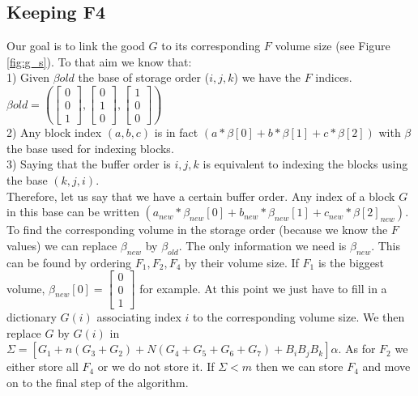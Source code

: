 \documentclass[conference]{IEEEtran}
\begin{document}
  \subsection{Keeping F4}
  Our goal is to link the good $G$ to its corresponding $F$ volume size (see Figure \ref{fig:g_s}).
  To that aim we know that: \\
  1) Given $\beta{old}$ the base of storage order ($i,j,k$) we have the $F$ indices.
    $\beta{old} = (
    \begin{bmatrix} 0 \\ 0 \\ 1 \end{bmatrix},
    \begin{bmatrix} 0 \\ 1 \\ 0 \end{bmatrix},
    \begin{bmatrix} 1 \\ 0 \\ 0 \end{bmatrix})$ \\
  2) Any block index $(a,b,c)$ is in fact $(a*\beta[0] + b*\beta[1] + c*\beta[2])$ with $\beta$ the base used for indexing blocks. \\
  3) Saying that the buffer order is $i, j, k$ is equivalent to indexing the blocks using the base $(k,j,i)$. \\

  Therefore, let us say that we have a certain buffer order.
  Any index of a block $G$ in this base can be written $(a_{new}*\beta_{new}[0] + b_{new}*\beta_{new}[1] + c_{new}*\beta[2]_{new})$.
  To find the corresponding volume in the storage order (because we know the $F$ values) we can replace $\beta_{new}$ by $\beta_{old}$.
  The only information we need is $\beta_{new}$. This can be found by ordering $F_1, F_2, F_4$ by their volume size.
  If $F_1$ is the biggest volume, $\beta_{new}[0] = \begin{bmatrix} 0 \\ 0 \\ 1 \end{bmatrix}$ for example.
  At this point we just have to fill in a dictionary $G(i)$ associating index $i$ to the corresponding volume size.
  We then replace $G$ by $G(i)$ in $\Sigma = [G_1 + n(G_3 + G_2) + N(G_4 + G_5 + G_6 + G_7) + B_iB_jB_k]\alpha$.
  As for $F_2$ we either store all $F_4$ or we do not store it.
  If $\Sigma < m$ then we can store $F_4$ and move on to the final step of the algorithm. \\
\end{document}
